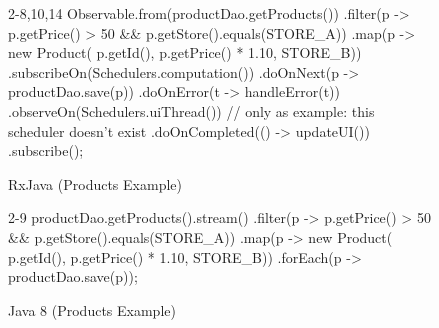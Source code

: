 \begin{figure}[h]
\begin{minipage}{0.48\textwidth}
\begin{sourcecode}
\begin{javacode}{2-8,10,14}
Observable.from(productDao.getProducts())
        .filter(p ->
                p.getPrice() > 50 &&
                p.getStore().equals(STORE_A))
        .map(p -> new Product(
                p.getId(),
                p.getPrice() * 1.10,
                STORE_B))
        .subscribeOn(Schedulers.computation())
        .doOnNext(p -> productDao.save(p))
        .doOnError(t -> handleError(t))
        .observeOn(Schedulers.uiThread()) // only as example: this scheduler doesn't exist
        .doOnCompleted(() -> updateUI())
        .subscribe();
\end{javacode}
\caption{RxJava (Products Example)}
\label{code:rxJava-compared}
\end{sourcecode}
\end{minipage}\hspace{0.7cm}
\begin{minipage}{0.48\textwidth}
\begin{sourcecode}
\begin{javacode}{2-9}
productDao.getProducts().stream()
        .filter(p ->
                p.getPrice() > 50 &&
                p.getStore().equals(STORE_A))
        .map(p -> new Product(
                p.getId(),
                p.getPrice() * 1.10,
                STORE_B))
        .forEach(p -> productDao.save(p));
\end{javacode}
\caption{Java 8 (Products Example)}
\label{code:java8-compared}
\end{sourcecode}
\end{minipage}
\end{figure}